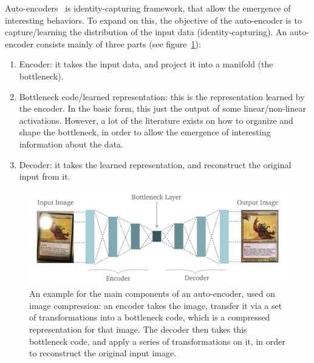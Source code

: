  \par Auto-encoders~\citep{hinton2006reducing} is identity-capturing framework, that allow the emergence of interesting behaviors. To expand on this, the objective of the auto-encoder is to capture/learning the distribution of the input data (identity-capturing). An auto-encoder consists mainly of three parts (see figure~\ref{fig:autoenc}):
  \begin{enumerate}
    \item Encoder: it takes the input data, and project it into a manifold (the bottleneck).
    \item Bottleneck code/learned representation: this is the representation learned by the encoder. In the basic form, this just the output of some linear/non-linear activations. However, a lot of the literature exists on how to organize and shape the bottleneck, in order to allow the emergence of interesting information about the data.
    \item Decoder: it takes the learned representation, and reconstruct the original input from it.
  \end{enumerate}

  \begin{figure}
    \centering
    \includegraphics[scale=0.8]{images/framework/autoencoder.png}
    \caption{An example for the main components of an auto-encoder, used on image compression: an encoder takes the image, transfer it via a set of transformations into a bottleneck code, which is a compressed representation for that image. The decoder then takes this bottleneck code, and apply a series of transformations on it, in order to reconstruct the original input image.}
    \label{fig:autoenc}
  \end{figure}



